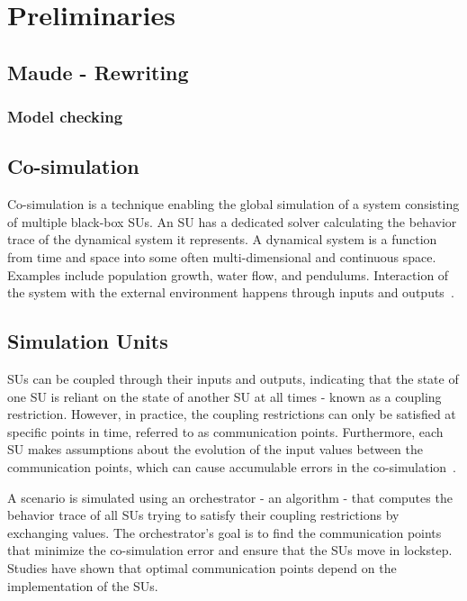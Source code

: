 \section{Preliminaries}\label{sc:background}

\subsection{Maude - Rewriting}
\subsubsection{Model checking}


\subsection{Co-simulation}
Co-simulation is a technique enabling the global simulation of a system consisting of multiple black-box SUs. 
An SU has a dedicated solver calculating the behavior trace of the dynamical system it represents. 
A dynamical system is a function from time and space into some often multi-dimensional and continuous space. Examples include population growth, water flow, and pendulums. 
Interaction of the system with the external environment happens through inputs and outputs~\cite{Gomes2019a,Kubler2000}.

\subsection{Simulation Units}
SUs can be coupled through their inputs and outputs, indicating that the state of one SU is reliant on the state of another SU at all times - known as a coupling restriction. However, in practice, the coupling restrictions can only be satisfied at specific points in time, referred to as communication points. Furthermore, each SU makes assumptions about the evolution of the input values between the communication points, which can cause accumulable errors in the co-simulation~\cite{Arnold2014}. 

A scenario is simulated using an orchestrator - an algorithm - that computes the behavior trace of all SUs trying to satisfy their coupling restrictions by exchanging values. 
The orchestrator's goal is to find the communication points that minimize the co-simulation error and ensure that the SUs move in lockstep. 
Studies \cite{Gomes2019,Oakes2021,Gomes2018f,Schweizer2015c,Gomes2018a} have shown that optimal communication points depend on the implementation of the SUs.

